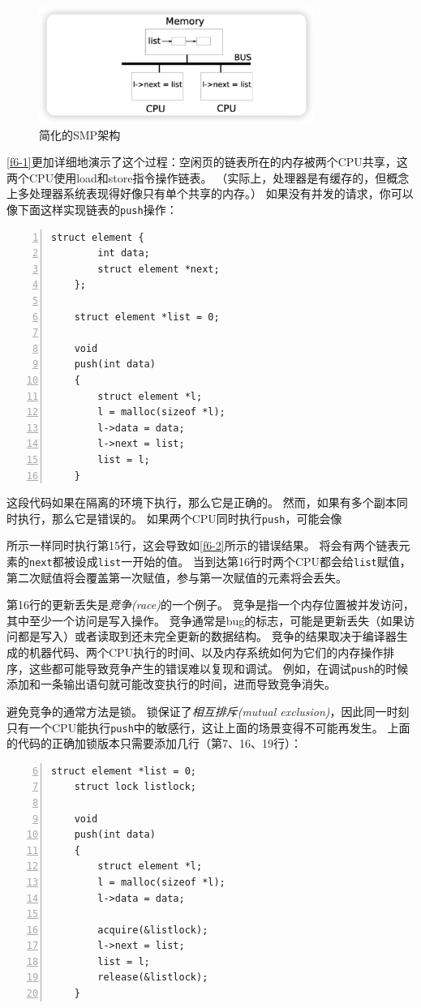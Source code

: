 \begin{figure}[htbp]
    \centering
    \includegraphics[width=0.8\textwidth]{../imgs/f6-1.png}
    \caption{简化的SMP架构}
    \label{f6-1}
\end{figure}

\autoref{f6-1}更加详细地演示了这个过程：空闲页的链表所在的内存被两个CPU共享，这两个CPU使用load和store指令操作链表。
（实际上，处理器是有缓存的，但概念上多处理器系统表现得好像只有单个共享的内存。）
如果没有并发的请求，你可以像下面这样实现链表的\texttt{push}操作：
\begin{lstlisting}[numbers=left]
    struct element {
        int data;
        struct element *next;
    };

    struct element *list = 0;

    void
    push(int data)
    {
        struct element *l;
        l = malloc(sizeof *l);
        l->data = data;
        l->next = list;
        list = l;
    }
\end{lstlisting}

这段代码如果在隔离的环境下执行，那么它是正确的。
然而，如果有多个副本同时执行，那么它是错误的。
如果两个CPU同时执行\texttt{push}，可能会像\author{f6-1}所示一样同时执行第15行，这会导致如\autoref{f6-2}所示的错误结果。
将会有两个链表元素的\texttt{next}都被设成\texttt{list}一开始的值。
当到达第16行时两个CPU都会给\texttt{list}赋值，第二次赋值将会覆盖第一次赋值，参与第一次赋值的元素将会丢失。

第16行的更新丢失是\emph{竞争(race)}的一个例子。
竞争是指一个内存位置被并发访问，其中至少一个访问是写入操作。
竞争通常是bug的标志，可能是更新丢失（如果访问都是写入）或者读取到还未完全更新的数据结构。
竞争的结果取决于编译器生成的机器代码、两个CPU执行的时间、以及内存系统如何为它们的内存操作排序，这些都可能导致竞争产生的错误难以复现和调试。
例如，在调试\texttt{push}的时候添加和一条输出语句就可能改变执行的时间，进而导致竞争消失。

避免竞争的通常方法是锁。
锁保证了\emph{相互排斥(mutual exclusion)}，因此同一时刻只有一个CPU能执行\texttt{push}中的敏感行，这让上面的场景变得不可能再发生。
上面的代码的正确加锁版本只需要添加几行（第7、16、19行）：
\begin{lstlisting}[numbers=left,firstnumber=6]
    struct element *list = 0;
    struct lock listlock;

    void 
    push(int data)
    {
        struct element *l;
        l = malloc(sizeof *l);
        l->data = data;
        
        acquire(&listlock);
        l->next = list;
        list = l;
        release(&listlock);
    }
\end{lstlisting}


